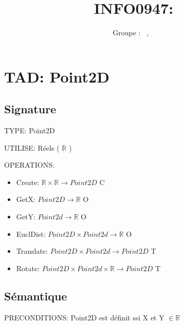 \documentclass[a4paper, 11pt, oneside]{article}
\title{INFO0947: \intitule}
\author{Groupe \GrNbr : \PrenomUN~\textsc{\NomUN}, \PrenomDEUX~\textsc{\NomDEUX}}
\date{}
\newcommand{\tablemat}{~}
\renewcommand{\tablemat}{\tableofcontents}
\begin{document}
\maketitle
\newpage
\tablemat
\newpage


\section{TAD: Point2D}

\subsection{Signature}

\noindent TYPE: Point2D

\noindent UTILISE: Réels ( $\mathbb{R}$ )

\noindent OPERATIONS: 
\begin{itemize}
    \item Create: $\mathbb{R} \times \mathbb{R} \xrightarrow{} Point2D$ {\color{green} C}
    \item GetX: $Point2D \xrightarrow{} \mathbb{R}$ {\color{green} O}
    \item GetY: $Point2d \xrightarrow{} \mathbb{R}$ {\color{green} O}
    \item EuclDist: $Point2D \times Point2d \xrightarrow{} \mathbb{R}$ {\color{green} O}
    \item Translate: $Point2D \times Point2d \xrightarrow{} Point2D$ {\color{green} T}
    \item Rotate: $Point2D \times Point2d \times \mathbb{R} \xrightarrow{} Point2D $ {\color{green} T}
\end{itemize}



\subsection{Sémantique}
\noindent PRECONDITIONS: Point2D est définit ssi X et Y $\in \mathbb{R}$ 
\end{document}
